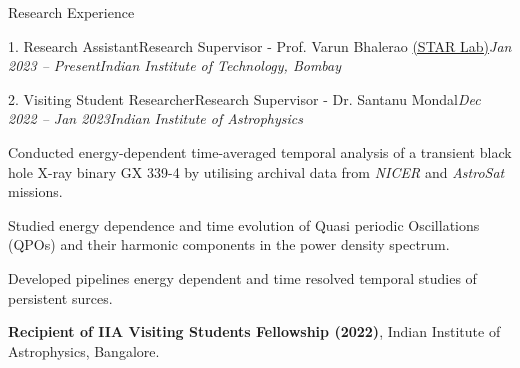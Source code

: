 \begin{section}{Research Experience}
\begin{subsection}{1. Research Assistant}{Research Supervisor - Prof. Varun Bhalerao \href{https://www.star-iitb.in/home}{(STAR Lab)}}{\textit{Jan 2023 -- Present}}{\textit{Indian Institute of Technology, Bombay}}
        \vspace{0.5em}         
    \end{subsection}
\vspace{-0.1em}
    \begin{subsection}{2. Visiting Student Researcher}{Research Supervisor - Dr. Santanu Mondal}{\textit{Dec 2022 -- Jan 2023}}{\textit{Indian Institute of Astrophysics}}
        \vspace{0.5em}
        \item Conducted energy-dependent time-averaged temporal analysis of a transient black hole X-ray binary GX 339-4 by utilising archival data from \textit{NICER} and \textit{AstroSat} missions.
        \item Studied energy dependence and time evolution of Quasi periodic Oscillations (QPOs) and their harmonic components in the power density spectrum. 
        \item Developed pipelines energy dependent and time resolved temporal studies of persistent surces. 
        \item \textbf{Recipient of IIA Visiting Students Fellowship (2022)}, Indian Institute of Astrophysics, Bangalore.
    \end{subsection}
\end{section}